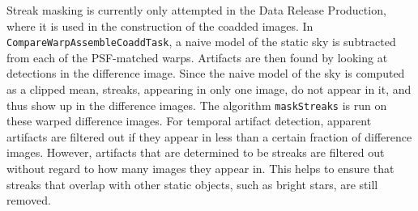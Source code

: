 \documentclass[DM,authoryear,toc]{lsstdoc}
\begin{document}
Streak masking is currently only attempted in the Data Release Production, where it is used in the construction of the coadded images. In \texttt{CompareWarpAssembleCoaddTask}, a naive model of the static sky is subtracted from each of the PSF-matched warps. Artifacts are then found by looking at detections in the difference image. Since the naive model of the sky is computed as a clipped mean, streaks, appearing in only one image, do not appear in it, and thus show up in the difference images. The algorithm \texttt{maskStreaks} is run on these warped difference images. For temporal artifact detection, apparent artifacts are filtered out if they appear in less than a certain fraction of difference images. However, artifacts that are determined to be streaks are filtered out without regard to how many images they appear in. This helps to ensure that streaks that overlap with other static objects, such as bright stars, are still removed. 
\end{document}
